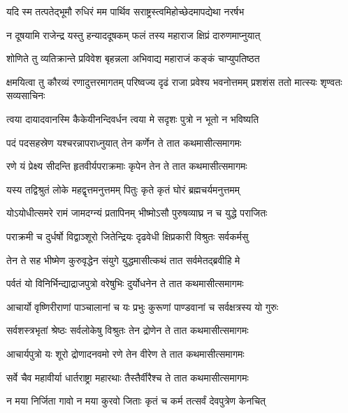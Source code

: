\twolineshloka
{यदि स्म तत्पतेद्भूमौ रुधिरं मम पार्थिव}
{सराष्ट्रस्त्वमिहोच्छेदमापद्येथा नरर्षभ}


\twolineshloka
{न दूषयामि राजेन्द्र यस्तु हन्याददूषकम्}
{फलं तस्य महाराज क्षिप्रं दारुणमाप्नुयात्}



\twolineshloka
{शोणिते तु व्यतिक्रान्ते प्रविवेश बृहन्नला}
{अभिवाद्य महाराजं कङ्कं चाप्युपतिष्ठत}


\threelineshloka
{क्षमयित्वा तु कौरव्यं रणादुत्तरमागतम्}
{परिष्वज्य दृढं राजा प्रवेश्य भवनोत्तमम्}
{प्रशशंस ततो मात्स्यः शृण्वतः सव्यसाचिनः}




\twolineshloka
{त्वया दायादवानस्मि कैकेयीनन्दिवर्धन}
{त्वया मे सदृशः पुत्रो न भूतो न भविष्यति}


\twolineshloka
{पदं पदसहस्रेण यश्चरन्नापराध्नुयात्}
{तेन कर्णेन ते तात कथमासीत्समागमः}


\twolineshloka
{रणे यं प्रेक्ष्य सीदन्ति हृतवीर्यपराक्रमाः}
{कृपेन तेन ते तात कथमासीत्समागमः}


\twolineshloka
{यस्य तद्विश्रुतं लोके महद्वृत्तमनुत्तमम्}
{पितुः कृते कृतं घोरं ब्रह्मचर्यमनुत्तमम्}


\twolineshloka
{योऽयोधीत्समरे रामं जामदग्न्यं प्रतापिनम्}
{भीष्मोऽसौ पुरुषव्याघ्र न च युद्धे पराजितः}


\twolineshloka
{पराक्रमी च दुर्धर्षो विद्वाञ्शूरो जितेन्द्रियः}
{दृढवेधी क्षिप्रकारी विश्रुतः सर्वकर्मसु}


\twolineshloka
{तेन ते सह भीष्मेण कुरुवृद्धेन संयुगे}
{युद्धमासीत्कथं तात सर्वमेतद्ब्रवीहि मे}


\twolineshloka
{पर्वतं यो विनिर्भिन्द्याद्राजपुत्रो वरेषुभिः}
{दुर्योधनेन ते तात कथमासीत्समागमः}


\twolineshloka
{आचार्यो वृष्णिरीराणां पाञ्चालानां च यः प्रभुः}
{कुरूणां पाण्डवानां च सर्वक्षत्रस्य यो गुरुः}


\twolineshloka
{सर्वशस्त्रभृतां श्रेष्ठः सर्वलोकेषु विश्रुतः}
{तेन द्रोणेन ते तात कथमासीत्समागमः}


\twolineshloka
{आचार्यपुत्रो यः शूरो द्रोणादनवमो रणे}
{तेन वीरेण ते तात कथमासीत्समागमः}


\twolineshloka
{सर्वे चैव महावीर्या धार्तराष्ट्रा महारथाः}
{तैस्तैर्वीरैश्च ते तात कथमासीत्समागमः}




\twolineshloka
{न मया निर्जिता गावो न मया कुरवो जिताः}
{कृतं च कर्म तत्सर्वं देवपुत्रेण केनचित्}


